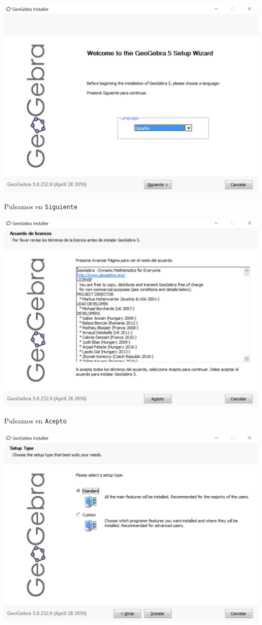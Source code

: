 \documentclass[10pt,a4paper]{article}
\begin{document}
    \begin{center}
    \includegraphics[width=14cm]{../fig/Tut00-GeoGebraSetup01-201605.png}
    \end{center}
Pulsamos en {\tt Siguiente}
    \begin{center}
    \includegraphics[width=14cm]{../fig/Tut00-GeoGebraSetup02-201605.png}
    \end{center}
Pulsamos en {\tt Acepto}
    \begin{center}
    \includegraphics[width=14cm]{../fig/Tut00-GeoGebraSetup03-201605.png}
    \end{center}
\end{document}
